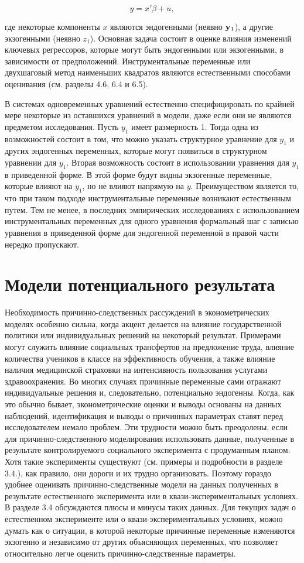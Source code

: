 \[
y=x'\beta+u,
\]

где некоторые компоненты $x$ являются эндогенными (неявно $\mathbf{y}_{1}$), а другие экзогенными (неявно $z_{1}$).
Основная задача состоит в оценке влияния изменений  ключевых регрессоров, которые могут быть эндогенными или экзогенными, в зависимости от предположений. Инструментальные переменные или двухшаговый метод наименьших квадратов являются естественными способами оценивания (см. разделы 4.6, 6.4 и 6.5).


В системах одновременных уравнений естественно специфицировать по крайней мере некоторые из оставшихся уравнений в модели, даже если они не являются предметом исследования. Пусть $y_{1}$ имеет размерность 1. Тогда одна из возможностей состоит в том, что можно указать структурное уравнение для $y_{1}$ и других эндогенных переменных, которые могут появиться в  структурном  уравнении для $y_{1}$. Вторая возможность состоит в использовании уравнения для  $y_{1}$ в приведенной форме. В этой форме будут видны экзогенные переменные, которые влияют на $y_{1}$, но не влияют напрямую на $y$. Преимуществом является то, что при таком подходе инструментальные переменные возникают естественным путем. Тем не менее, в последних эмпирических исследованиях с использованием инструментальных переменных для одного уравнения формальный шаг с записью уравнения в приведенной форме для эндогенной переменной в правой части нередко пропускают.
	
	
\section{Модели потенциального результата}


Необходимость причинно-следственных рассуждений в эконометрических моделях особенно сильна, когда акцент делается на влияние государственной политики или индивидуальных решений на некоторый результат. Примерами могут служить  влияние социальных трансфертов на предложение труда, влияние количества учеников в классе на эффективность обучения, а также влияние наличия медицинской страховки на интенсивность пользования услугами здравоохранения. 
Во многих случаях причинные переменные сами отражают индивидуальные решения и, следовательно, потенциально эндогенны. Когда, как это обычно бывает, эконометрические оценки и выводы основаны на данных наблюдений, идентификация и выводы о причинных параметрах ставят перед исследователем немало проблем. 
Эти трудности можно быть преодолены, если для причинно-следственного моделирования  использовать данные, полученные в результате контролируемого социального эксперимента с продуманным планом. 
Хотя такие эксперименты существуют (см. примеры и подробности в разделе 3.4.), как правило, они дороги и их трудно организовать.
Поэтому гораздо удобнее оценивать причинно-следственные модели на данных полученных в результате  естественного эксперимента или в квази-экспериментальных условиях. 
В разделе 3.4 обсуждаются плюсы и минусы таких  данных. Для текущих задач о естественном эксперименте или о квази-экспериментальных условиях, можно думать как о ситуации, в которой некоторые причинные переменные изменяются экзогенно и независимо от других объясняющих переменных, что позволяет относительно легче  оценить причинно-следственные параметры.
	
